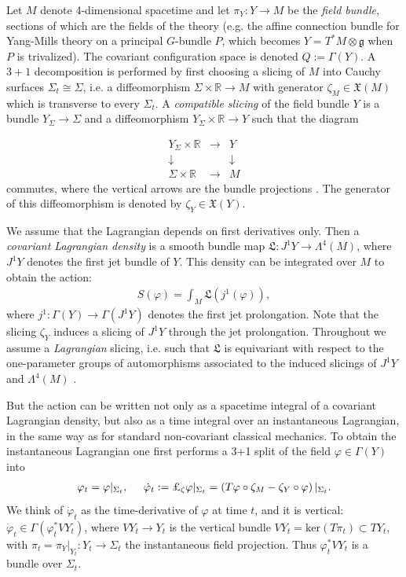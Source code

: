 \documentclass{article}
\newcommand{\R}{\mathbb{R}}
\theoremstyle{definition}
\begin{document}
Let $M$ denote 4-dimensional spacetime and let $\pi_Y\colon Y\to M$ be the \textit{field bundle}, sections of which are the fields of the theory (e.g. the affine connection bundle for Yang-Mills theory on a principal $G$-bundle $P$, which becomes $Y=T^*M\otimes\mathfrak{g}$ when $P$ is trivalized). The covariant configuration space is denoted $Q:=\Gamma(Y)$. A $3+1$ decomposition is performed by first choosing a slicing of $M$ into Cauchy surfaces $\Sigma_t\cong\Sigma$, i.e. a diffeomorphism $\Sigma\times \R\to M$ with generator $\zeta_M\in\mathfrak{X}(M)$ which is transverse to every $\Sigma_t$. A \textit{compatible slicing} of the field bundle $Y$ is a bundle $Y_\Sigma\to \Sigma$ and a diffeomorphism $Y_\Sigma\times \R\to Y$ such that the diagram

$$\begin{array}{ccc}
Y_{\Sigma} \times \mathbb{R} & \longrightarrow & Y \\
\downarrow & & \downarrow \\
\Sigma\times \mathbb{R} & \longrightarrow & M
\end{array}$$
commutes, where the vertical arrows are the bundle projections \cite{gotayMomentumMapsClassical2004a}. The generator of this diffeomorphism is denoted by $\zeta_Y\in \mathfrak{X}(Y)$.

We assume that the Lagrangian depends on first derivatives only. Then a
\textit{covariant Lagrangian density} is a smooth bundle map $\mathfrak{L}\colon J^1Y\to \Lambda^4(M)$, where $ J^1Y$ denotes the first jet bundle of $Y$. This density can be integrated over $M$ to obtain the action:
\begin{align*}
    S(\varphi)=\int_ M\mathfrak{L}(j^1(\varphi)),
\end{align*}
where $j^1\colon\Gamma(Y)\to \Gamma(J^1Y)$ denotes the first jet prolongation. Note that the slicing $\zeta_Y$ induces a slicing of $J^1Y$ through the jet prolongation. Throughout we assume a \textit{Lagrangian} slicing, i.e. such that $\mathfrak{L}$ is equivariant with respect to the
one-parameter groups of automorphisms associated to the induced slicings of $J^1 Y$ and $\Lambda^4(M)$ \cite{gotayMomentumMapsClassical2004a}.

But the action can be written not only as a spacetime integral of a covariant Lagrangian density, but also as a time integral over an instantaneous Lagrangian, in the same way as for standard non-covariant classical mechanics. To obtain the instantaneous Lagrangian one first performs a 3+1 split of the field $\varphi\in\Gamma(Y)$ into
\begin{align*}
    \varphi_t=\varphi|_{\Sigma_t},\;\;\;\;\;\dot{\varphi}_t:=\text{\pounds}_{\zeta}\varphi|_{\Sigma_t}=\left(T\varphi\circ\zeta_M-\zeta_Y\circ\varphi\right)|_{\Sigma_t}.
\end{align*}
We think of $\dot{\varphi}_t$ as the time-derivative of $\varphi$ at time $t$, and it is vertical: $\dot{\varphi}_t\in \Gamma(\varphi_t^*VY_t)$, where $VY_t\to Y_t$ is the vertical bundle $VY_t=\text{ker}(T\pi_t)\subset TY_t$, with $\pi_t=\pi_Y|_{Y_t}\colon Y_t\to\Sigma_t$ the instantaneous field projection. Thus $\varphi_t^*VY_t$ is a bundle over $\Sigma_t$.
\end{document}
